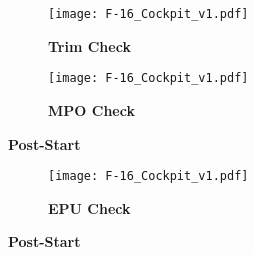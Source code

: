 \documentclass[fontInter]{TechCheck}
\begin{document}
	\begin{figure}[h]
		\centering
		\begin{subfigure}[t]{0.3\linewidth}
			\centering
			\texttt{[image: F-16\_Cockpit\_v1.pdf]}
			\caption*{\textbf{Trim Check}}
		\end{subfigure}
		\begin{subfigure}[t]{0.3\linewidth}
			\centering
			\texttt{[image: F-16\_Cockpit\_v1.pdf]}
			\caption*{\textbf{MPO Check}}
		\end{subfigure}
		\caption{\textbf{Post-Start}}
		\label{fig:proc:testschecks3}
	\end{figure}

	\clearpage

	\begin{tablenumerate}[resume]
	\end{tablenumerate}

	\begin{figure}[h]
		\centering
		\begin{subfigure}[t]{0.45\linewidth}
			\centering
			\texttt{[image: F-16\_Cockpit\_v1.pdf]}
			\caption*{\textbf{EPU Check}}
		\end{subfigure}
		\caption{\textbf{Post-Start}}
		\label{fig:proc:testschecks4}
	\end{figure}
\end{document}
